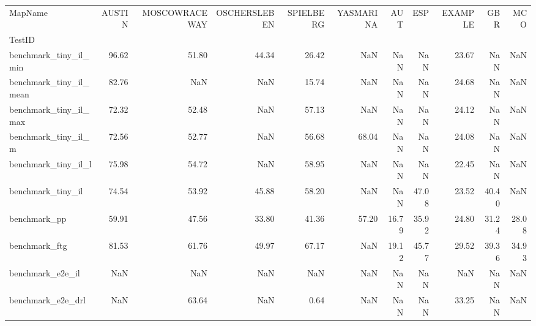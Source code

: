 \begin{tabular}{lrrrrrrrrrr}
\toprule
MapName & AUSTIN & MOSCOWRACEWAY & OSCHERSLEBEN & SPIELBERG & YASMARINA & AUT & ESP & EXAMPLE & GBR & MCO \\
TestID &  &  &  &  &  &  &  &  &  &  \\
\midrule
benchmark_tiny_il_min & 96.62 & 51.80 & 44.34 & 26.42 & NaN & NaN & NaN & 23.67 & NaN & NaN \\
benchmark_tiny_il_mean & 82.76 & NaN & NaN & 15.74 & NaN & NaN & NaN & 24.68 & NaN & NaN \\
benchmark_tiny_il_max & 72.32 & 52.48 & NaN & 57.13 & NaN & NaN & NaN & 24.12 & NaN & NaN \\
benchmark_tiny_il_m & 72.56 & 52.77 & NaN & 56.68 & 68.04 & NaN & NaN & 24.08 & NaN & NaN \\
benchmark_tiny_il_l & 75.98 & 54.72 & NaN & 58.95 & NaN & NaN & NaN & 22.45 & NaN & NaN \\
benchmark_tiny_il & 74.54 & 53.92 & 45.88 & 58.20 & NaN & NaN & 47.08 & 23.52 & 40.40 & NaN \\
benchmark_pp & 59.91 & 47.56 & 33.80 & 41.36 & 57.20 & 16.79 & 35.92 & 24.80 & 31.24 & 28.08 \\
benchmark_ftg & 81.53 & 61.76 & 49.97 & 67.17 & NaN & 19.12 & 45.77 & 29.52 & 39.36 & 34.93 \\
benchmark_e2e_il & NaN & NaN & NaN & NaN & NaN & NaN & NaN & NaN & NaN & NaN \\
benchmark_e2e_drl & NaN & 63.64 & NaN & 0.64 & NaN & NaN & NaN & 33.25 & NaN & NaN \\
\bottomrule
\end{tabular}
